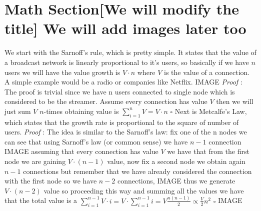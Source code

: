 \documentclass[12pt, a4page]{article}
\begin{document}
\section{Math Section[We will modify the title] We will add images later too}
We start with the Sarnoff's rule, which is pretty simple. It states that the value of a broadcast network is linearly proportional to it's users, so basically if we have $n$ users we will have the value growth is $V \cdot n$ where $V$ is the value of a connection. A simple example would be a radio or companies like Netflix.
\newline IMAGE \newline
\textit{Proof} : The proof is trivial since we have n users connected to single node which is considered to be the streamer. Assume every connection has value $V$ then we will just sum $V$ $n$-times obtaining value is $\sum_{i=1}^{n} V = V \cdot n$ \hfill $\square$
\newline
\newline
Next is Metcalfe's Law, which states that the growth rate is proportional to the square of number of users.\newline
\textit{Proof} : The idea is similar to the Sarnoff's law: fix one of the n nodes we can see that using Sarnoff's law (or common sense) we have $n-1$ connection
IMAGE \newline
assuming that every connection has value $V$ we have that from the first node we are gaining $V \cdot (n - 1)$ value, now fix a second node we obtain again $n-1$ connections but remember that we have already considered the connection with the first node so we have $n-2$ connections,\newline
IMAGE \newline
thus we generate $V \cdot (n - 2)$ value so proceeding this way and summing all the values we have that the total value is a $\sum_{i=1}^{n-1} V \cdot i = V \cdot \sum_{i=1}^{n-1} i = V \frac{n(n-1)}{2} \propto \frac{V}{2} n^2$  \hfill $\square$
\newline IMAGE \newline
\end{document}
